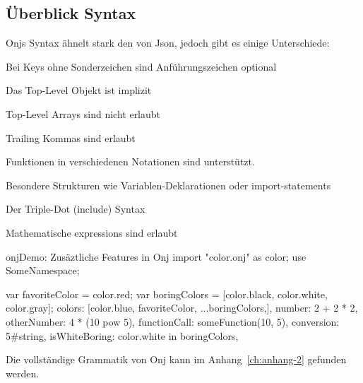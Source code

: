 
\subsection{Überblick Syntax}\label{subsec:ueberblick-syntax}

\renewcommand{\kapitelautor}{Autor: Marvin Kurka}

Onjs Syntax ähnelt stark den von Json, jedoch gibt es einige Unterschiede:
\begin{liste}
    \item Bei Keys ohne Sonderzeichen sind Anführungszeichen optional
    \item Das Top-Level Objekt ist implizit
    \item Top-Level Arrays sind nicht erlaubt
    \item Trailing Kommas sind erlaubt
    \item Funktionen in verschiedenen Notationen sind unterstützt.
    \item Besondere Strukturen wie Variablen-Deklarationen oder import-statements
    \item Der Triple-Dot (include) Syntax
    \item Mathematische expressions sind erlaubt
\end{liste}

\begin{codeBlock}{onj}{Demo: Zusäztliche Features in Onj}
import "color.onj" as color;
use SomeNamespace;

var favoriteColor = color.red;
var boringColors = [color.black, color.white, color.gray];
colors: [color.blue, favoriteColor, ...boringColors,],
number: 2 + 2 * 2,
otherNumber: 4 * (10 pow 5),
functionCall: someFunction(10, 5),
conversion: 5#string,
isWhiteBoring: color.white in boringColors,
\end{codeBlock}

\begin{infoBox}
Die vollständige Grammatik von Onj kann im Anhang~\ref{ch:anhang-2} gefunden werden.
\end{infoBox}

\renewcommand{\kapitelautor}{}
